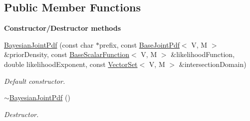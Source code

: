 \subsection*{Public Member Functions}
\begin{Indent}{\bf Constructor/\-Destructor methods}\par
\begin{DoxyCompactItemize}
\item 
\hyperlink{class_q_u_e_s_o_1_1_bayesian_joint_pdf_a035122f1015976118ba96c9cd37edda0}{Bayesian\-Joint\-Pdf} (const char $\ast$prefix, const \hyperlink{class_q_u_e_s_o_1_1_base_joint_pdf}{Base\-Joint\-Pdf}$<$ V, M $>$ \&prior\-Density, const \hyperlink{class_q_u_e_s_o_1_1_base_scalar_function}{Base\-Scalar\-Function}$<$ V, M $>$ \&likelihood\-Function, double likelihood\-Exponent, const \hyperlink{class_q_u_e_s_o_1_1_vector_set}{Vector\-Set}$<$ V, M $>$ \&intersection\-Domain)
\begin{DoxyCompactList}\small\item\em Default constructor. \end{DoxyCompactList}\item 
\hyperlink{class_q_u_e_s_o_1_1_bayesian_joint_pdf_a060c1d9fcfd092dbc5501afaa9b362db}{$\sim$\-Bayesian\-Joint\-Pdf} ()
\begin{DoxyCompactList}\small\item\em Destructor. \end{DoxyCompactList}\end{DoxyCompactItemize}
\end{Indent}
